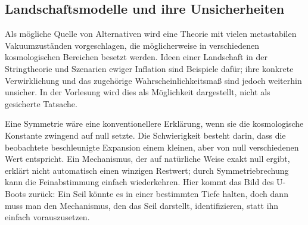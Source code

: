 \subsection{Landschaftsmodelle und ihre Unsicherheiten}

Als mögliche Quelle von Alternativen wird eine Theorie mit vielen metastabilen Vakuumzuständen vorgeschlagen, die möglicherweise in verschiedenen kosmologischen Bereichen besetzt werden. Ideen einer Landschaft in der Stringtheorie und Szenarien ewiger Inflation sind Beispiele dafür; ihre konkrete Verwirklichung und das zugehörige Wahrscheinlichkeitsmaß sind jedoch weiterhin unsicher. In der Vorlesung wird dies als Möglichkeit dargestellt, nicht als gesicherte Tatsache.

Eine Symmetrie wäre eine konventionellere Erklärung, wenn sie die kosmologische Konstante zwingend auf null setzte. Die Schwierigkeit besteht darin, dass die beobachtete beschleunigte Expansion einem kleinen, aber von null verschiedenen Wert entspricht. Ein Mechanismus, der auf natürliche Weise exakt null ergibt, erklärt nicht automatisch einen winzigen Restwert; durch Symmetriebrechung kann die Feinabstimmung einfach wiederkehren. Hier kommt das Bild des U-Boots zurück: Ein Seil könnte es in einer bestimmten Tiefe halten, doch dann muss man den Mechanismus, den das Seil darstellt, identifizieren, statt ihn einfach vorauszusetzen.

\begin{classroomqa}
\end{classroomqa}

\begin{classroomqa}
\end{classroomqa}

